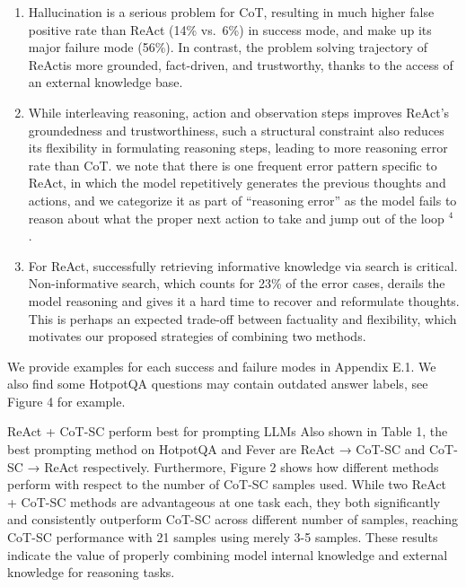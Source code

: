 \documentclass[
]{article}
\providecommand{\tightlist}{%
  \setlength{\itemsep}{0pt}\setlength{\parskip}{0pt}}
\begin{document}
\begin{enumerate}
\def\labelenumi{\Alph{enumi})}
\tightlist
\item
  Hallucination is a serious problem for CoT, resulting in much higher
  false positive rate than ReAct (14\% vs.~6\%) in success mode, and
  make up its major failure mode (56\%). In contrast, the problem
  solving trajectory of ReActis more grounded, fact-driven, and
  trustworthy, thanks to the access of an external knowledge base.\\
\item
  While interleaving reasoning, action and observation steps improves
  ReAct's groundedness and trustworthiness, such a structural constraint
  also reduces its flexibility in formulating reasoning steps, leading
  to more reasoning error rate than CoT. we note that there is one
  frequent error pattern specific to ReAct, in which the model
  repetitively generates the previous thoughts and actions, and we
  categorize it as part of ``reasoning error'' as the model fails to
  reason about what the proper next action to take and jump out of the
  loop \(^{4}\) .\\
\item
  For ReAct, successfully retrieving informative knowledge via search is
  critical. Non-informative search, which counts for 23\% of the error
  cases, derails the model reasoning and gives it a hard time to recover
  and reformulate thoughts. This is perhaps an expected trade-off
  between factuality and flexibility, which motivates our proposed
  strategies of combining two methods.
\end{enumerate}

We provide examples for each success and failure modes in Appendix E.1.
We also find some HotpotQA questions may contain outdated answer labels,
see Figure 4 for example.

ReAct + CoT-SC perform best for prompting LLMs Also shown in Table 1,
the best prompting method on HotpotQA and Fever are ReAct → CoT-SC and
CoT-SC → ReAct respectively. Furthermore, Figure 2 shows how different
methods perform with respect to the number of CoT-SC samples used. While
two ReAct + CoT-SC methods are advantageous at one task each, they both
significantly and consistently outperform CoT-SC across different number
of samples, reaching CoT-SC performance with 21 samples using merely 3-5
samples. These results indicate the value of properly combining model
internal knowledge and external knowledge for reasoning tasks.
\end{document}
